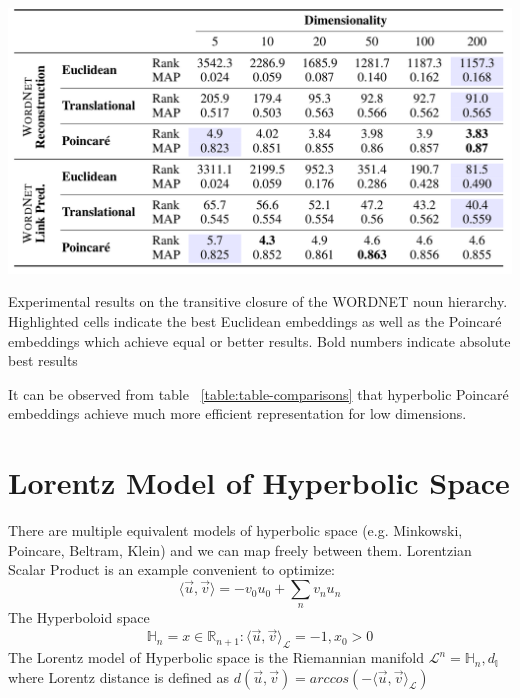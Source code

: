 \begin{table}[htb]
  \centering
    \includegraphics[width=\textwidth]{lectures/11-b/Images/1-3.png}
    \caption{Experimental results on the transitive closure of the WORDNET noun hierarchy. Highlighted cells indicate the best Euclidean embeddings as well as the Poincaré embeddings which achieve equal or better results. Bold numbers indicate absolute best results}
    \label{table:table-comparisons}
\end{table}

It can be observed from table  ~\ref{table:table-comparisons} that hyperbolic Poincaré embeddings achieve much more efficient representation for low dimensions. 

\section{Lorentz Model of Hyperbolic Space}

There are multiple equivalent models of hyperbolic space (e.g. Minkowski, Poincare, Beltram, Klein) and we can map freely between them. Lorentzian Scalar Product is an example convenient to optimize:
\begin{equation} \label{eq:riemmaniansdg3}
         \langle \vec{u},\vec{v} \rangle = -v_0 u_0 + \sum_n v_n u_n
\end{equation}  
The Hyperboloid space 
\begin{equation} \label{eq:riemmaniansdg4}
         \mathbb{H}_n = {x \in \mathbb{R}_{n+1}:\langle \vec{u},\vec{v} \rangle_{ \mathcal{L}}= -1, x_0 > 0 }
\end{equation}  
The Lorentz model of Hyperbolic space is the Riemannian manifold  $\mathcal{L}^n =  \mathbb{H}_n , d_{\mathbb{l}}$
where Lorentz distance is defined as $d(\vec{u},\vec{v}) = arccos (-\langle \vec{u},\vec{v} \rangle_{ \mathcal{L}}) $

